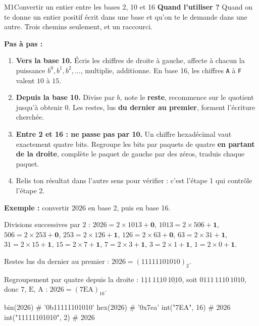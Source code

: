 \begin{fichemethode}{M1}{Convertir un entier entre les bases 2, 10 et 16}
\textbf{Quand l'utiliser ?} Quand on te donne un entier positif écrit dans une base et
qu'on te le demande dans une autre. Trois chemins seulement, et un raccourci.

\textbf{Pas à pas :}
\begin{enumerate}
  \item \textbf{Vers la base 10.} Écris les chiffres de droite à gauche, affecte à chacun la
    puissance $b^0, b^1, b^2, \dots$, multiplie, additionne. En base 16, les chiffres
    \lstinline{A} à \lstinline{F} valent $10$ à $15$.
  \item \textbf{Depuis la base 10.} Divise par $b$, note le \textbf{reste}, recommence sur le
    quotient jusqu'à obtenir $0$. Les restes, lus \textbf{du dernier au premier}, forment
    l'écriture cherchée.
  \item \textbf{Entre 2 et 16 : ne passe pas par 10.} Un chiffre hexadécimal vaut exactement
    quatre bits. Regroupe les bits par paquets de quatre \textbf{en partant de la droite},
    complète le paquet de gauche par des zéros, traduis chaque paquet.
  \item Relis ton résultat dans l'autre sens pour vérifier : c'est l'étape 1 qui contrôle
    l'étape 2.
\end{enumerate}

\textbf{Exemple :} convertir $2026$ en base 2, puis en base 16.

Divisions successives par $2$ : $2026 = 2 \times 1013 + \mathbf{0}$, $1013 = 2 \times 506 + \mathbf{1}$,
$506 = 2 \times 253 + \mathbf{0}$, $253 = 2 \times 126 + \mathbf{1}$, $126 = 2 \times 63 + \mathbf{0}$,
$63 = 2 \times 31 + \mathbf{1}$, $31 = 2 \times 15 + \mathbf{1}$, $15 = 2 \times 7 + \mathbf{1}$,
$7 = 2 \times 3 + \mathbf{1}$, $3 = 2 \times 1 + \mathbf{1}$, $1 = 2 \times 0 + \mathbf{1}$.

Restes lus du dernier au premier : $2026 = (11111101010)_2$.

Regroupement par quatre depuis la droite : $\underline{111}\,\underline{1110}\,\underline{1010}$,
soit $0111\,1110\,1010$, donc $7$, $\text{E}$, $\text{A}$ : $2026 = (\text{7EA})_{16}$.

\begin{python}
bin(2026)   # '0b11111101010'
hex(2026)   # '0x7ea'
int("7EA", 16)   # 2026
int("11111101010", 2)   # 2026
\end{python}


\end{fichemethode}
